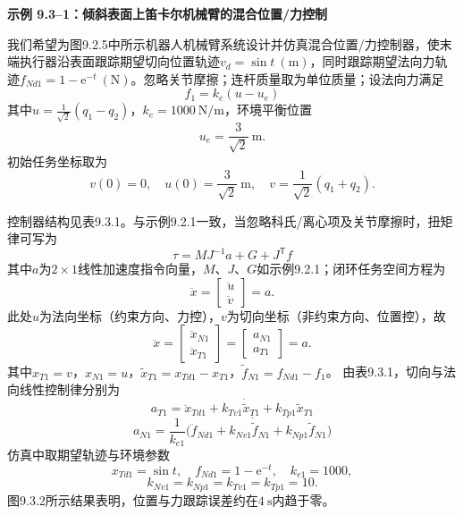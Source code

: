\documentclass[12pt,a4paper]{ctexart}
\begin{document}
\textbf{示例 9.3--1：倾斜表面上笛卡尔机械臂的混合位置/力控制}

我们希望为图9.2.5中所示机器人机械臂系统设计并仿真混合位置/力控制器，使末端执行器沿表面跟踪期望切向位置轨迹$v_d = \sin t\ \mathrm{(m)}$，同时跟踪期望法向力轨迹$f_{Nd1} = 1 - \mathrm{e}^{-t}\ \mathrm{(N)}$。忽略关节摩擦；连杆质量取为单位质量；设法向力满足
\begin{equation}\label{eq:9.3.38}
f_1 = k_e(u - u_e)
\end{equation}
其中$u = \frac{1}{\sqrt{2}}(q_1 - q_2)$，$k_e = 1000\ \mathrm{N/m}$，环境平衡位置
\begin{equation*}
u_e = \frac{3}{\sqrt{2}}\ \mathrm{m}.
\end{equation*}
初始任务坐标取为
\begin{equation}\label{eq:9.3.39}
v(0) = 0, \quad u(0) = \frac{3}{\sqrt{2}}\ \mathrm{m}, \quad v = \frac{1}{\sqrt{2}}(q_1 + q_2).
\end{equation}

控制器结构见表9.3.1。与示例9.2.1一致，当忽略科氏/离心项及关节摩擦时，扭矩律可写为
\begin{equation}\label{eq:9.3.40}
\tau = M J^{-1} a + G + J^{\mathsf T} f
\end{equation}
其中$a$为$2\times 1$线性加速度指令向量，$M$、$J$、$G$如示例9.2.1；闭环任务空间方程为
\begin{equation}\label{eq:9.3.41}
\ddot{x} = \begin{bmatrix} \ddot{u} \\ \ddot{v} \end{bmatrix} = a.
\end{equation}
此处$u$为法向坐标（约束方向、力控），$v$为切向坐标（非约束方向、位置控），故
\begin{equation}\label{eq:9.3.42}
\ddot{x} = \begin{bmatrix} \ddot{x}_{N1} \\ \ddot{x}_{T1} \end{bmatrix} = \begin{bmatrix} a_{N1} \\ a_{T1} \end{bmatrix} = a.
\end{equation}
其中$x_{T1}=v$，$x_{N1}=u$，$\tilde{x}_{T1}=x_{Td1}-x_{T1}$，$\tilde{f}_{N1}=f_{Nd1}-f_1$。
由表9.3.1，切向与法向线性控制律分别为
\begin{equation}\label{eq:9.3.43}
a_{T1} = \ddot{x}_{Td1} + k_{Tv1}\dot{\tilde{x}}_{T1} + k_{Tp1}\tilde{x}_{T1}
\end{equation}
\begin{equation}\label{eq:9.3.44}
a_{N1} = \frac{1}{k_{e1}}\bigl(\ddot{f}_{Nd1} + k_{Nv1}\dot{\tilde{f}}_{N1} + k_{Np1}\tilde{f}_{N1}\bigr)
\end{equation}
仿真中取期望轨迹与环境参数
\begin{equation}\label{eq:9.3.45}
x_{Td1} = \sin t, \quad f_{Nd1} = 1 - \mathrm{e}^{-t}, \quad k_{e1} = 1000,
\end{equation}
\begin{equation*}
k_{Nv1} = k_{Np1} = k_{Tv1} = k_{Tp1} = 10.
\end{equation*}
图9.3.2所示结果表明，位置与力跟踪误差约在$4\ \mathrm{s}$内趋于零。
\end{document}
